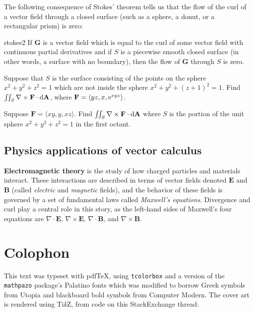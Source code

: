 \documentclass{watsonbook}
\begin{document}
  The following consequence of Stokes' theorem tells us that the flow
  of the curl of a vector field through a closed surface (such as a
  sphere, a donut, or a rectangular prism) is zero:

  \begin{obs}{}{stokes2}
    If $\mathbf{G}$ is a vector field which is equal to the curl of
    some vector field with continuous partial derivatives and if $S$
    is a piecewise smooth closed surface (in other words, a surface
    with no boundary), then the flow of $\mathbf{G}$ through $S$ is
    zero.
\end{obs}

\begin{exercise}{}{}
  Suppose that $S$ is the surface consisting of the points on the
  sphere $x^2 + y^2 + z^2 = 1$ which are not inside the sphere
  $x^2 + y^2 + (z+1)^2 = 1$. Find $\iint_{S} \nabla \times \mathbf{F}
  \cdot \mathrm{d}\mathbf{A}$, where $\mathbf{F} = \langle yz, x, \operatorname{e}^{xyz}
  \rangle$. 
\end{exercise}

\begin{exercise}{}{}
  Suppose $\mathbf{F} = \langle xy, y, xz \rangle$. Find
  $\iint_S \nabla \times \mathbf{F} \cdot \mathrm{d}\mathbf{A}$ where $S$ is
  the portion of the unit sphere $x^2 + y^2 + z^2 = 1$ in the first
  octant.
\end{exercise}

\section{Physics applications of vector calculus} \label{physapps} 

\textbf{Electromagnetic theory} is the study of how charged particles
and materials interact. These interactions are described in terms of
vector fields denoted $\mathbf{E}$ and $\mathbf{B}$ (called
\textit{electric} and \textit{magnetic} fields), and the behavior of
these fields is governed by a set of fundamental laws called
\textit{Maxwell's equations}. Divergence and curl play a central role
in this story, as the left-hand sides of Maxwell's four equations are
$\nabla \cdot \mathbf{E}$, $\nabla \times \mathbf{E}$, $\nabla \cdot
\mathbf{B}$, and $\nabla \times \mathbf{B}$. 

\chapter*{Colophon}

This text was typeset with pdf\TeX, using \texttt{tcolorbox} and a version of the
\texttt{mathpazo} package's Palatino fonts which was modified to borrow
Greek symbols from Utopia and blackboard bold symbols from Computer
Modern. The cover art is rendered using Ti\textit{k}Z, from code on
this StackExchange thread:
\end{document}
